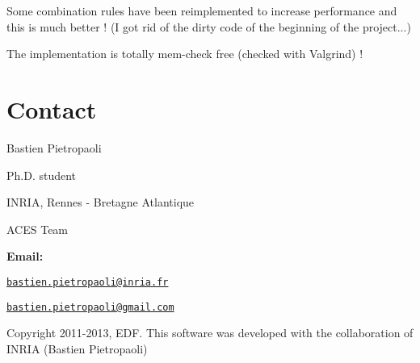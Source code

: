  Some combination rules have been reimplemented to increase performance and this is much better ! (I got rid of the dirty code of the beginning of the project...) \par
 The implementation is totally mem-\/check free (checked with Valgrind) ! \par
\hypertarget{version_sec_Version_contact}{}\section{Contact}\label{version_sec_Version_contact}
Bastien Pietropaoli \par
 Ph.\-D. student \par
 I\-N\-R\-I\-A, Rennes -\/ Bretagne Atlantique \par
 A\-C\-E\-S Team \par


{\bfseries Email\-:} \par
 \href{mailto:bastien.pietropaoli@inria.fr}{\tt bastien.\-pietropaoli@inria.\-fr} \par
 \href{mailto:bastien.pietropaoli@gmail.com}{\tt bastien.\-pietropaoli@gmail.\-com} \par


Copyright 2011-\/2013, E\-D\-F. This software was developed with the collaboration of I\-N\-R\-I\-A (Bastien Pietropaoli) 